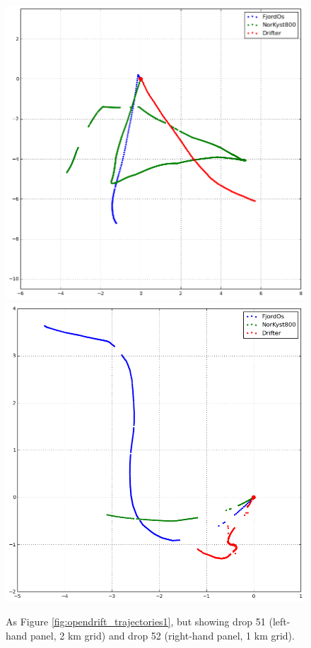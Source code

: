 \begin{figure}[htb]
	\centerline{
		\includegraphics*[width=.5\textwidth]{Figurer/opendrift/skillscore/drop51i4}
		\includegraphics*[width=.5\textwidth]{Figurer/opendrift/skillscore/drop52i8}
		}
	\caption{\small As Figure \ref{fig:opendrift_trajectories1}, but showing drop 51 (left-hand panel, 2 km grid) and drop 52 (right-hand panel, 1 km grid).}
	\label{fig:opendrift_trajectories2}
\end{figure}

